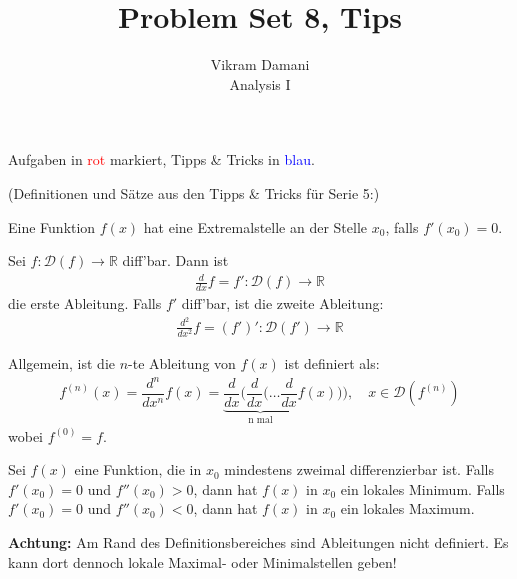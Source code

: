 \documentclass[12pt]{article}
\newcommand{\R}{\mathbb{R}} %
\newenvironment{definition}[2][Definition]{\begin{trivlist}
        \item[\hskip \labelsep {\bfseries #1}\hskip \labelsep {\bfseries #2.}]}{\flushright{$\square$}\end{trivlist}}
\newenvironment{problem}[2][\textcolor{blue}{Tipps \& Tricks zu}]{\begin{trivlist}
        \item[\hskip \labelsep {\bfseries #1}\hskip \labelsep {\bfseries \textcolor{blue}{#2}.}]}{\end{trivlist}}
\begin{document}
\title{Problem Set 8, Tips}
\author{Vikram Damani\\
        Analysis I}

\maketitle
Aufgaben in \textcolor{red}{rot} markiert, Tipps \& Tricks in \textcolor{blue}{blau}.

\begin{problem}{1}

\end{problem}
 (Definitionen und Sätze aus den Tipps \& Tricks für Serie 5:)
\begin{definition}{[Extremalstellen]}
        Eine Funktion $f(x)$ hat eine Extremalstelle an der Stelle $x_0$, falls $f'(x_0)=0$.
\end{definition}

\begin{definition}{[Höhere Ableitungen]}
        Sei $f:\mathcal{D}(f)\to\R$ diff'bar. Dann ist
        \begin{align}
                \frac{d}{dx}f=f':\mathcal{D}(f)\to\R
        \end{align}
        die erste Ableitung. Falls $f'$ diff'bar, ist die zweite Ableitung:
        \begin{align}
                \frac{d^2}{dx^2}f=(f')':\mathcal{D}(f')\to\R
        \end{align}

        Allgemein, ist die $n$-te Ableitung von $f(x)$ ist definiert als:
        \begin{align*}
                f^{(n)}(x)=\dfrac{d^n}{dx^n}f(x)=\underbrace{\dfrac{d}{dx}(\dfrac{d}{dx}(\ldots\dfrac{d}{dx}}_{\text{n mal}}f(x))),\quad x\in\mathcal{D}(f^{(n)})
        \end{align*}
        wobei $f^{(0)}=f$.
\end{definition}
\begin{definition}{[Maxima und Minima mit höheren Ableitungen]}
        Sei $f(x)$ eine Funktion, die in $x_0$ mindestens zweimal differenzierbar ist. Falls $f'(x_0)=0$ und $f''(x_0)>0$, dann hat $f(x)$ in $x_0$ ein lokales Minimum. Falls $f'(x_0)=0$ und $f''(x_0)<0$, dann hat $f(x)$ in
        $x_0$ ein lokales Maximum.

        \textbf{Achtung:} Am Rand des Definitionsbereiches sind Ableitungen nicht definiert. Es kann dort dennoch lokale Maximal- oder Minimalstellen geben!
\end{definition}
\end{document}
